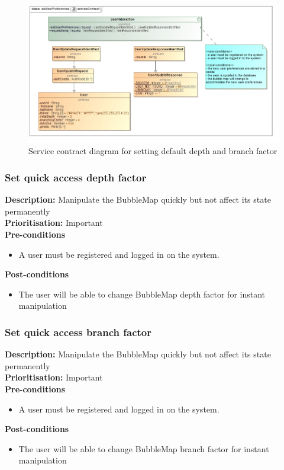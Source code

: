 \documentclass[hidelinks,english]{article}
\begin{document}
    			\begin{figure}[!h]
    			\includegraphics[width=\linewidth]{setUserPreferencesServiceContract.jpg}
    			\caption{Service contract diagram for setting default depth and branch factor}
    			\label{ServiceContractDefaultFactors}
    			\end{figure}
    			
    		
    			
    		
    		\subsubsection{Set quick access depth factor}
				\textbf{Description:}  Manipulate the BubbleMap quickly but not affect its state permanently\\
			    \textbf{Prioritisation:} Important\\
      			\textbf{Pre-conditions}
			    \begin{itemize}
			        \item A user must be registered and logged in on the system.
			    \end{itemize}
    			\textbf{Post-conditions}
			    \begin{itemize}
			    	\item The user will be able to change BubbleMap depth factor for instant manipulation
    			\end{itemize}
    		
    		\subsubsection{Set quick access branch factor}
				\textbf{Description:}  Manipulate the BubbleMap quickly but not affect its state permanently\\
			    \textbf{Prioritisation:} Important\\
      			\textbf{Pre-conditions}
			    \begin{itemize}
			        \item A user must be registered and logged in on the system.
			    \end{itemize}
    			\textbf{Post-conditions}
			    \begin{itemize}
			    	\item The user will be able to change BubbleMap branch factor for instant manipulation
    			\end{itemize}
    		
\end{document}
